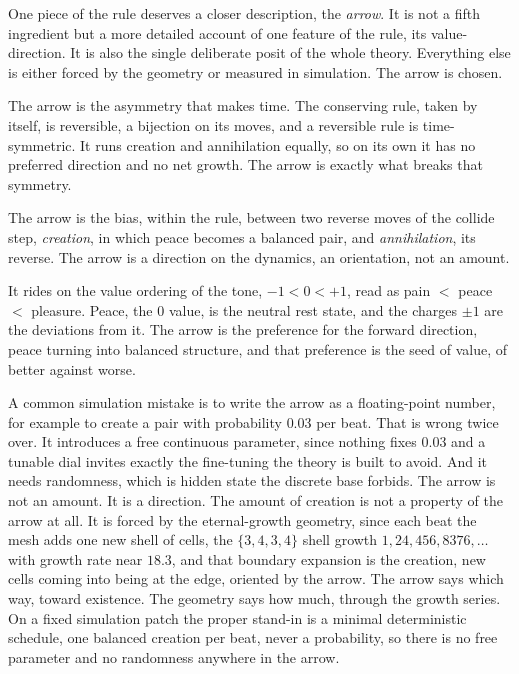 One piece of the rule deserves a closer description, the \emph{arrow}. It is not a fifth ingredient but a more
detailed account of one feature of the rule, its value-direction. It is also the single deliberate posit of the
whole theory. Everything else is either forced by the geometry or measured in simulation. The arrow is chosen.

The arrow is the asymmetry that makes time. The conserving rule, taken by itself, is reversible, a bijection on
its moves, and a reversible rule is time-symmetric. It runs creation and annihilation equally, so on its own it
has no preferred direction and no net growth. The arrow is exactly what breaks that symmetry.

\begin{definition}
The arrow is the bias, within the rule, between two reverse moves of the collide step, \emph{creation}, in which
peace becomes a balanced pair, and \emph{annihilation}, its reverse. The arrow is a direction on the dynamics, an
orientation, not an amount.
\end{definition}

It rides on the value ordering of the tone, $-1 < 0 < +1$, read as pain $<$ peace $<$ pleasure. Peace, the $0$
value, is the neutral rest state, and the charges $\pm 1$ are the deviations from it. The arrow is the preference
for the forward direction, peace turning into balanced structure, and that preference is the seed of value, of
better against worse.

A common simulation mistake is to write the arrow as a floating-point number, for example to create a pair with
probability $0.03$ per beat. That is wrong twice over. It introduces a free continuous parameter, since nothing
fixes $0.03$ and a tunable dial invites exactly the fine-tuning the theory is built to avoid. And it needs
randomness, which is hidden state the discrete base forbids. The arrow is not an amount. It is a direction. The
amount of creation is not a property of the arrow at all. It is forced by the eternal-growth geometry, since each
beat the mesh adds one new shell of cells, the $\{3,4,3,4\}$ shell growth $1, 24, 456, 8376, \ldots$ with growth
rate near $18.3$, and that boundary expansion is the creation, new cells coming into being at the edge, oriented
by the arrow. The arrow says which way, toward existence. The geometry says how much, through the growth series.
On a fixed simulation patch the proper stand-in is a minimal deterministic schedule, one balanced creation per
beat, never a probability, so there is no free parameter and no randomness anywhere in the arrow.

